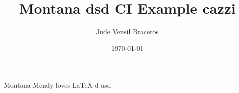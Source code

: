 \documentclass{article}
\title{Montana dsd  CI Example cazzi}
\author{Jude Vensil Braceros}
\date{\today}
\begin{document}
\maketitle

Montana Mendy loves LaTeX d asd
\end{document}
